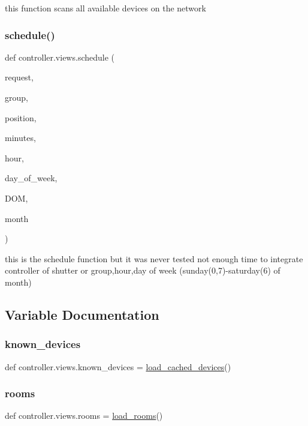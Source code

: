 this function scans all available devices on the network 

\mbox{\label{namespacecontroller_1_1views_aeb01ffa1920fe22255534bb5d3b20648}} 
\subsubsection{\texorpdfstring{schedule()}{schedule()}}
{\footnotesize\ttfamily def controller.\+views.\+schedule (\begin{DoxyParamCaption}\item[{}]{request,  }\item[{}]{group,  }\item[{}]{position,  }\item[{}]{minutes,  }\item[{}]{hour,  }\item[{}]{day\+\_\+of\+\_\+week,  }\item[{}]{D\+OM,  }\item[{}]{month }\end{DoxyParamCaption})}



this is the schedule function but it was never tested not enough time to integrate controller of shutter or group,hour,day of week (sunday(0,7)-\/saturday(6) of month) 



\subsection{Variable Documentation}
\mbox{\label{namespacecontroller_1_1views_af9e2f21b0adee926bb6d31dc3d5b401d}} 
\subsubsection{\texorpdfstring{known\+\_\+devices}{known\_devices}}
{\footnotesize\ttfamily def controller.\+views.\+known\+\_\+devices = \hyperlink{namespacecontroller_1_1views_a981a57611ae7537ed58369b7d4476a65}{load\+\_\+cached\+\_\+devices}()}

\mbox{\label{namespacecontroller_1_1views_a05586480fa7fea962dd67235dc66527f}} 
\subsubsection{\texorpdfstring{rooms}{rooms}}
{\footnotesize\ttfamily def controller.\+views.\+rooms = \hyperlink{namespacecontroller_1_1views_a7d95618cd1b42c41c244c565d20fed55}{load\+\_\+rooms}()}

